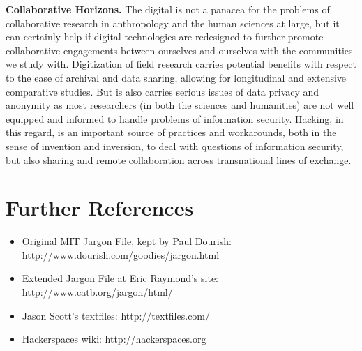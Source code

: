 \documentclass[10pt,letter,oneside]{scrartcl}
\begin{document}


{\bf Collaborative Horizons.} The digital is not a panacea for the problems of
collaborative research in anthropology and the human sciences at large, but it
can certainly help if digital technologies are redesigned to further promote
collaborative engagements between ourselves and ourselves with the communities
we study with. Digitization of field research carries potential benefits with
respect to the ease of archival and data sharing, allowing for longitudinal and
extensive comparative studies. But is also carries serious issues of data
privacy and anonymity as most researchers (in both the sciences and humanities)
are not well equipped and informed to handle problems of information security.
Hacking, in this regard, is an important source of practices and workarounds,
both in the sense of invention and inversion, to deal with questions of
information security, but also sharing and remote collaboration across
transnational lines of exchange.











\section*{Further References}

\begin{itemize}
\item  Original MIT Jargon File, kept by Paul Dourish:
  http://www.dourish.com/goodies/jargon.html 
\item  Extended Jargon File at Eric Raymond's site:
  http://www.catb.org/jargon/html/
\item Jason Scott's textfiles:
  http://textfiles.com/ 
\item Hackerspaces wiki: 
  http://hackerspaces.org
\end{itemize}

% 

\printbibliography 
\end{document}
